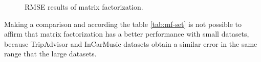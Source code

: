 \begin{figure}
\captionsetup{font=footnotesize}
\centering
{}
\caption{RMSE results of matrix factorization.}
\label{fig:fm-test}   
\end{figure}
Making a comparison 
and according the table \ref{tab:mf-set} is not possible 
to affirm that matrix factorization has a better performance 
with small datasets, because TripAdvisor and InCarMusic datasets 
obtain a similar error in the same range that the large datasets.



